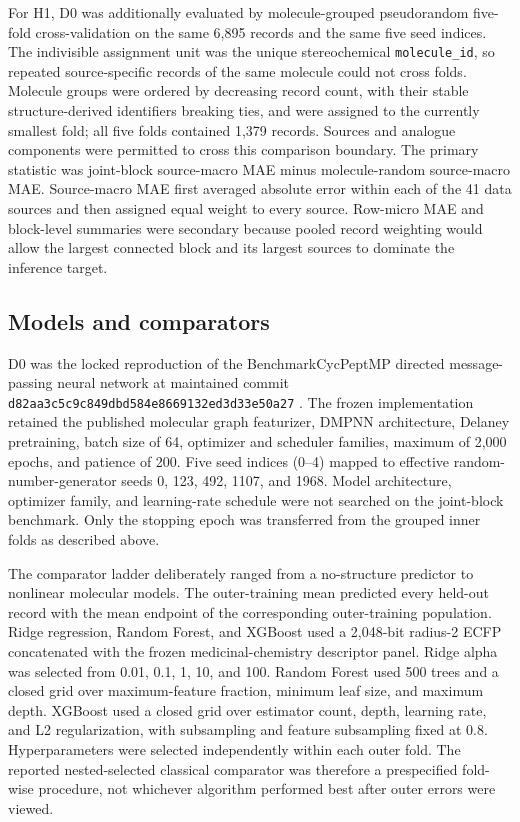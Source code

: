 \documentclass[referee,lineno,pdflatex,Numbered,sn-basic]{sn-jnl}
\begin{document}
For H1, D0 was additionally evaluated by molecule-grouped pseudorandom five-fold cross-validation on the same 6,895 records and the same five seed indices. The indivisible assignment unit was the unique stereochemical \texttt{molecule\_id}, so repeated source-specific records of the same molecule could not cross folds. Molecule groups were ordered by decreasing record count, with their stable structure-derived identifiers breaking ties, and were assigned to the currently smallest fold; all five folds contained 1,379 records. Sources and analogue components were permitted to cross this comparison boundary. The primary statistic was joint-block source-macro MAE minus molecule-random source-macro MAE. Source-macro MAE first averaged absolute error within each of the 41 data sources and then assigned equal weight to every source. Row-micro MAE and block-level summaries were secondary because pooled record weighting would allow the largest connected block and its largest sources to dominate the inference target.

\subsection{Models and comparators}

D0 was the locked reproduction of the BenchmarkCycPeptMP directed message-passing neural network at maintained commit \texttt{d82aa3c5\allowbreak{}c9c849db\allowbreak{}d584e866\allowbreak{}9132ed3d\allowbreak{}33e50a27} \cite{liu2025benchmark}. The frozen implementation retained the published molecular graph featurizer, DMPNN architecture, Delaney pretraining, batch size of 64, optimizer and scheduler families, maximum of 2,000 epochs, and patience of 200. Five seed indices (0--4) mapped to effective random-number-generator seeds 0, 123, 492, 1107, and 1968. Model architecture, optimizer family, and learning-rate schedule were not searched on the joint-block benchmark. Only the stopping epoch was transferred from the grouped inner folds as described above.

The comparator ladder deliberately ranged from a no-structure predictor to nonlinear molecular models. The outer-training mean predicted every held-out record with the mean endpoint of the corresponding outer-training population. Ridge regression, Random Forest, and XGBoost used a 2,048-bit radius-2 ECFP concatenated with the frozen medicinal-chemistry descriptor panel. Ridge alpha was selected from 0.01, 0.1, 1, 10, and 100. Random Forest used 500 trees and a closed grid over maximum-feature fraction, minimum leaf size, and maximum depth. XGBoost used a closed grid over estimator count, depth, learning rate, and L2 regularization, with subsampling and feature subsampling fixed at 0.8. Hyperparameters were selected independently within each outer fold. The reported nested-selected classical comparator was therefore a prespecified fold-wise procedure, not whichever algorithm performed best after outer errors were viewed.
\end{document}

